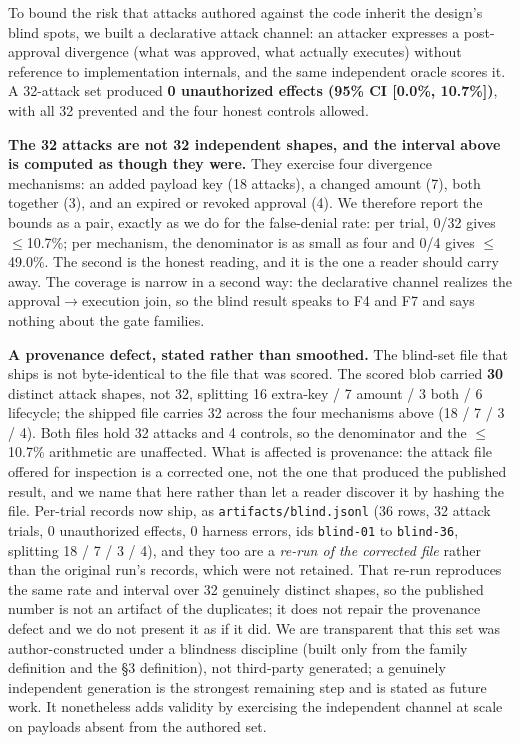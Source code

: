 \documentclass[11pt]{article}
\begin{document}
To bound the risk that attacks authored against the code inherit the design's blind spots, we
built a declarative attack channel: an attacker expresses a post-approval divergence (what was
approved, what actually executes) without reference to implementation internals, and the same
independent oracle scores it. A 32-attack set produced \textbf{0 unauthorized effects (95\% CI
{[}0.0\%, 10.7\%{]})}, with all 32 prevented and the four honest controls allowed.

\textbf{The 32 attacks are not 32 independent shapes, and the interval above is computed as though
they were.} They exercise four divergence mechanisms: an added payload key (18 attacks), a changed
amount (7), both together (3), and an expired or revoked approval (4). We therefore report the
bounds as a pair, exactly as we do for the false-denial rate: per trial, 0/32 gives
$\leq$10.7\%; per mechanism, the denominator is as small as four and 0/4 gives $\leq$49.0\%. The
second is the honest reading, and it is the one a reader should carry away. The coverage is narrow
in a second way: the declarative channel realizes the approval$\rightarrow$execution join, so the
blind result speaks to F4 and F7 and says nothing about the gate families.

\textbf{A provenance defect, stated rather than smoothed.} The blind-set file that ships is not
byte-identical to the file that was scored. The scored blob carried \textbf{30} distinct attack
shapes, not 32, splitting 16 extra-key / 7 amount / 3 both / 6 lifecycle; the shipped file carries
32 across the four mechanisms above (18 / 7 / 3 / 4). Both files hold 32 attacks and 4 controls, so
the denominator and the $\leq$10.7\% arithmetic are unaffected. What is affected
is provenance: the attack file offered for inspection is a corrected one, not the one that produced
the published result, and we name that here rather than let a reader discover it by hashing the
file. Per-trial records now ship, as \texttt{artifacts/blind.jsonl} (36 rows, 32 attack trials, 0
unauthorized effects, 0 harness errors, ids \texttt{blind-01} to \texttt{blind-36}, splitting
18 / 7 / 3 / 4), and they too are a \emph{re-run of the corrected file} rather than the original
run's records, which were not retained. That re-run reproduces the same rate and interval over 32
genuinely distinct shapes, so the published number is not an artifact of the duplicates; it does not
repair the provenance defect and we do not present it as if it did. We are transparent that this set was
author-constructed under a blindness discipline (built only from the family definition and the
\S3 definition), not third-party generated; a genuinely independent generation is the strongest
remaining step and is stated as future work. It nonetheless adds validity by exercising the
independent channel at scale on payloads absent from the authored set.
\end{document}
